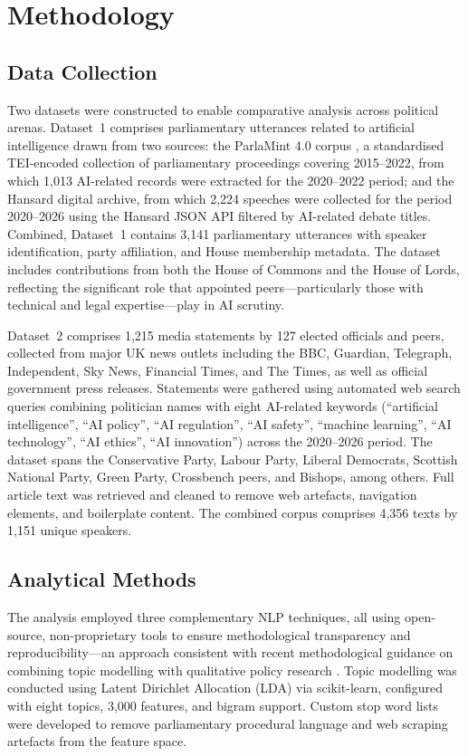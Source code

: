 \chapter{Methodology}

\section{Data Collection}

Two datasets were constructed to enable comparative analysis across political arenas. Dataset~1 comprises parliamentary utterances related to artificial intelligence drawn from two sources: the ParlaMint 4.0 corpus \parencite{erjavec2023}, a standardised TEI-encoded collection of parliamentary proceedings covering 2015--2022, from which 1,013 AI-related records were extracted for the 2020--2022 period; and the Hansard digital archive, from which 2,224 speeches were collected for the period 2020--2026 using the Hansard JSON API filtered by AI-related debate titles. Combined, Dataset~1 contains 3,141 parliamentary utterances with speaker identification, party affiliation, and House membership metadata. The dataset includes contributions from both the House of Commons and the House of Lords, reflecting the significant role that appointed peers---particularly those with technical and legal expertise---play in AI scrutiny.

Dataset~2 comprises 1,215 media statements by 127 elected officials and peers, collected from major UK news outlets including the BBC, Guardian, Telegraph, Independent, Sky News, Financial Times, and The Times, as well as official government press releases. Statements were gathered using automated web search queries combining politician names with eight AI-related keywords (``artificial intelligence'', ``AI policy'', ``AI regulation'', ``AI safety'', ``machine learning'', ``AI technology'', ``AI ethics'', ``AI innovation'') across the 2020--2026 period. The dataset spans the Conservative Party, Labour Party, Liberal Democrats, Scottish National Party, Green Party, Crossbench peers, and Bishops, among others. Full article text was retrieved and cleaned to remove web artefacts, navigation elements, and boilerplate content. The combined corpus comprises 4,356 texts by 1,151 unique speakers.

\section{Analytical Methods}

The analysis employed three complementary NLP techniques, all using open-source, non-proprietary tools to ensure methodological transparency and reproducibility---an approach consistent with recent methodological guidance on combining topic modelling with qualitative policy research \parencite{isoaho2021}. Topic modelling was conducted using Latent Dirichlet Allocation (LDA) via scikit-learn, configured with eight topics, 3,000 features, and bigram support. Custom stop word lists were developed to remove parliamentary procedural language and web scraping artefacts from the feature space.

